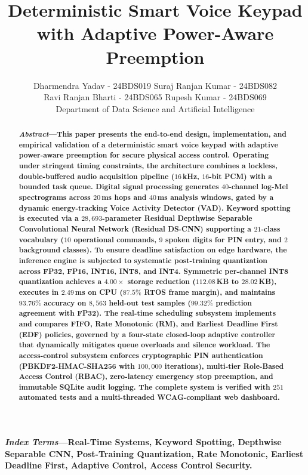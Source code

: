 \documentclass[10pt,twocolumn,letterpaper]{article}
\title{\vspace{-10pt}\textbf{\LARGE Deterministic Smart Voice Keypad with Adaptive Power-Aware Preemption}\vspace{6pt}}
\author{
  \normalsize Dharmendra Yadav - 24BDS019 \qquad Suraj Ranjan Kumar - 24BDS082 \\[4pt]
  \normalsize Ravi Ranjan Bharti - 24BDS065 \qquad Rupesh Kumar - 24BDS069 \\[6pt]
  \small Department of Data Science and Artificial Intelligence
}
\date{}
\begin{document}
\maketitle

\begin{abstract}
\small
\textbf{\textit{Abstract}---This paper presents the end-to-end design, implementation, and empirical validation of a deterministic smart voice keypad with adaptive power-aware preemption for secure physical access control. Operating under stringent timing constraints, the architecture combines a lockless, double-buffered audio acquisition pipeline ($16$\,kHz, $16$-bit PCM) with a bounded task queue. Digital signal processing generates $40$-channel log-Mel spectrograms across $20$\,ms hops and $40$\,ms analysis windows, gated by a dynamic energy-tracking Voice Activity Detector (VAD). Keyword spotting is executed via a $28{,}693$-parameter Residual Depthwise Separable Convolutional Neural Network (Residual DS-CNN) supporting a $21$-class vocabulary ($10$ operational commands, $9$ spoken digits for PIN entry, and $2$ background classes). To ensure deadline satisfaction on edge hardware, the inference engine is subjected to systematic post-training quantization across FP32, FP16, INT16, INT8, and INT4. Symmetric per-channel INT8 quantization achieves a $4.00\times$ storage reduction ($112.08$\,KB to $28.02$\,KB), executes in $2.49$\,ms on CPU ($87.5\%$ RTOS frame margin), and maintains $93.76\%$ accuracy on $8{,}563$ held-out test samples ($99.32\%$ prediction agreement with FP32). The real-time scheduling subsystem implements and compares FIFO, Rate Monotonic (RM), and Earliest Deadline First (EDF) policies, governed by a four-state closed-loop adaptive controller that dynamically mitigates queue overloads and silence workload. The access-control subsystem enforces cryptographic PIN authentication (PBKDF2-HMAC-SHA256 with $100{,}000$ iterations), multi-tier Role-Based Access Control (RBAC), zero-latency emergency stop preemption, and immutable SQLite audit logging. The complete system is verified with $251$ automated tests and a multi-threaded WCAG-compliant web dashboard.}
\end{abstract}

\vspace{3pt}
\noindent\textbf{\textit{Index Terms}---Real-Time Systems, Keyword Spotting, Depthwise Separable CNN, Post-Training Quantization, Rate Monotonic, Earliest Deadline First, Adaptive Control, Access Control Security.}
\end{document}
